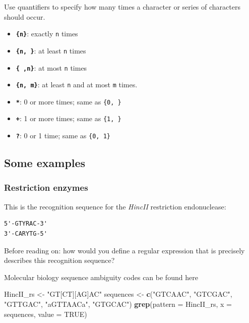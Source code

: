 \documentclass[]{book}
\newenvironment{Shaded}{\begin{snugshade}}{\end{snugshade}}
\newcommand{\DataTypeTok}[1]{\textcolor[rgb]{0.13,0.29,0.53}{#1}}
\newcommand{\KeywordTok}[1]{\textcolor[rgb]{0.13,0.29,0.53}{\textbf{#1}}}
\newcommand{\NormalTok}[1]{#1}
\newcommand{\OtherTok}[1]{\textcolor[rgb]{0.56,0.35,0.01}{#1}}
\newcommand{\StringTok}[1]{\textcolor[rgb]{0.31,0.60,0.02}{#1}}
\providecommand{\tightlist}{%
  \setlength{\itemsep}{0pt}\setlength{\parskip}{0pt}}
\begin{document}
Use quantifiers to specify how many times a character or series of characters should occur.

\begin{itemize}
\tightlist
\item
  \textbf{\texttt{\{n\}}}: exactly \texttt{n} times
\item
  \textbf{\texttt{\{n,\ \}}}: at least \texttt{n} times
\item
  \textbf{\texttt{\{\ ,n\}}}: at most \texttt{n} times
\item
  \textbf{\texttt{\{n,\ m\}}}: at least \texttt{n} and at most \texttt{m} times.
\item
  \textbf{\texttt{*}}: 0 or more times; same as \texttt{\{0,\ \}}
\item
  \textbf{\texttt{+}}: 1 or more times; same as \texttt{\{1,\ \}}
\item
  \textbf{\texttt{?}}: 0 or 1 time; same as \texttt{\{0,\ 1\}}
\end{itemize}

\hypertarget{some-examples}{%
\subsection{Some examples}\label{some-examples}}

\hypertarget{restriction-enzymes}{%
\subsubsection*{Restriction enzymes}\label{restriction-enzymes}}

This is the recognition sequence for the \emph{HincII} restriction endonuclease:

\begin{verbatim}
5'-GTYRAC-3'
3'-CARYTG-5'
\end{verbatim}

Before reading on: how would you define a regular expression that is precisely describes this recognition sequence?

Molecular biology sequence ambiguity codes can be found
here

\begin{Shaded}
\begin{Highlighting}[]
\NormalTok{HincII_rs <-}\StringTok{ "GT[CT][AG]AC"}
\NormalTok{sequences <-}\StringTok{ }\KeywordTok{c}\NormalTok{(}\StringTok{"GTCAAC"}\NormalTok{,}
               \StringTok{"GTCGAC"}\NormalTok{,}
               \StringTok{"GTTGAC"}\NormalTok{,}
               \StringTok{"aGTTAACa"}\NormalTok{,}
               \StringTok{"GTGCAC"}\NormalTok{)}
\KeywordTok{grep}\NormalTok{(}\DataTypeTok{pattern =}\NormalTok{ HincII_rs, }\DataTypeTok{x =}\NormalTok{ sequences, }\DataTypeTok{value =} \OtherTok{TRUE}\NormalTok{)}
\end{Highlighting}
\end{Shaded}
\end{document}
